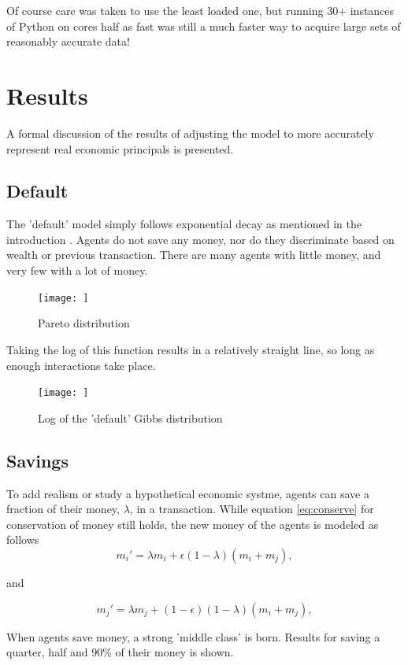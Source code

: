 \documentclass[12pt]{article} %
\begin{document}
Of course care was taken to use the least loaded one, but running 30+ instances
of Python on cores half as fast was still a much faster way to acquire large
sets of reasonably accurate data!

\section{Results}
A formal discussion of the results of adjusting the model to more accurately
represent real economic principals is presented.

\subsection{Default}
The 'default' model simply follows exponential decay as mentioned in the
introduction \cite{Pareto}. Agents do not save any money, nor do they
discriminate based on wealth or previous transaction. There are many agents
with little money, and very few with a lot of money.
\newcommand{\scaleResults}{0.75}
\begin{figure}
	\texttt{[image: ]}
	\caption{Pareto distribution}
\end{figure}

Taking the log of this function results in a relatively straight line, so long
as enough interactions take place.
\begin{figure}
	\texttt{[image: ]}
	\caption{Log of the 'default' Gibbs distribution}
\end{figure}

\subsection{Savings}
To add realism or study a hypothetical economic systme, agents can save a
fraction of their money, $\lambda$, in a transaction. While equation
\eqref{eq:conserve} for conservation of money still holds, the new money of
the agents is modeled as follows
\begin{equation*}
  m_i' = \lambda m_i+\epsilon(1-\lambda)(m_i+m_j),
\end{equation*}

and

\begin{equation*}
  m_j' = \lambda m_j+(1-\epsilon)(1-\lambda)(m_i+m_j),
\end{equation*}

When agents save money, a strong 'middle class' is born. Results for saving a
quarter, half and 90\% of their money is shown.
\end{document}
